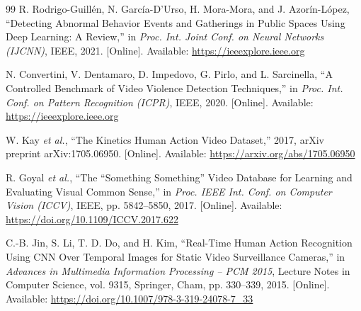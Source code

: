 \begin{thebibliography}{99}
R. Rodrigo-Guill{\'e}n, N. Garc{\'i}a-D'Urso, H. Mora-Mora, and J. Azor{\'i}n-L{\'o}pez, 
``Detecting Abnormal Behavior Events and Gatherings in Public Spaces Using Deep Learning: A Review,'' 
in \textit{Proc. Int. Joint Conf. on Neural Networks (IJCNN)}, IEEE, 2021. 
[Online]. Available: \url{https://ieeexplore.ieee.org}

N. Convertini, V. Dentamaro, D. Impedovo, G. Pirlo, and L. Sarcinella, 
``A Controlled Benchmark of Video Violence Detection Techniques,'' 
in \textit{Proc. Int. Conf. on Pattern Recognition (ICPR)}, IEEE, 2020. 
[Online]. Available: \url{https://ieeexplore.ieee.org}

W. Kay \textit{et al.}, 
``The Kinetics Human Action Video Dataset,'' 
2017, arXiv preprint arXiv:1705.06950. 
[Online]. Available: \url{https://arxiv.org/abs/1705.06950}

R. Goyal \textit{et al.}, 
``The ``Something Something'' Video Database for Learning and Evaluating Visual Common Sense,'' 
in \textit{Proc. IEEE Int. Conf. on Computer Vision (ICCV)}, IEEE, pp. 5842--5850, 2017. 
[Online]. Available: \url{https://doi.org/10.1109/ICCV.2017.622}

C.-B. Jin, S. Li, T. D. Do, and H. Kim, 
``Real-Time Human Action Recognition Using {CNN} Over Temporal Images for Static Video Surveillance Cameras,'' 
in \textit{Advances in Multimedia Information Processing -- PCM 2015}, 
Lecture Notes in Computer Science, vol. 9315, Springer, Cham, pp. 330--339, 2015. 
[Online]. Available: \url{https://doi.org/10.1007/978-3-319-24078-7\_33}

\end{thebibliography}